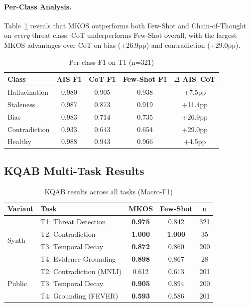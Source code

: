 \documentclass[11pt]{article}
\begin{document}
\paragraph{Per-Class Analysis.} Table~\ref{tab:perclass} reveals that MKOS outperforms both Few-Shot and Chain-of-Thought on \emph{every} threat class. CoT underperforms Few-Shot overall, with the largest MKOS advantages over CoT on bias (+26.9pp) and contradiction (+29.0pp).

\begin{table}[h]
\centering
\caption{Per-class F1 on T1 (n=321)}
\label{tab:perclass}
\begin{tabular}{lcccc}
\toprule
\textbf{Class} & \textbf{AIS F1} & \textbf{CoT F1} & \textbf{Few-Shot F1} & \textbf{$\Delta$ AIS--CoT} \\
\midrule
Hallucination & 0.980 & 0.905 & 0.938 & +7.5pp \\
Staleness & 0.987 & 0.873 & 0.919 & +11.4pp \\
Bias & 0.983 & 0.714 & 0.735 & +26.9pp \\
Contradiction & 0.933 & 0.643 & 0.654 & +29.0pp \\
Healthy & 0.988 & 0.943 & 0.966 & +4.5pp \\
\bottomrule
\end{tabular}
\end{table}

\subsection{KQAB Multi-Task Results}

\begin{table}[h]
\centering
\caption{KQAB results across all tasks (Macro-F1)}
\label{tab:kqab}
\begin{tabular}{llccc}
\toprule
\textbf{Variant} & \textbf{Task} & \textbf{MKOS} & \textbf{Few-Shot} & \textbf{n} \\
\midrule
\multirow{4}{*}{Synth}
& T1: Threat Detection & \textbf{0.975} & 0.842 & 321 \\
& T2: Contradiction & \textbf{1.000} & \textbf{1.000} & 35 \\
& T3: Temporal Decay & \textbf{0.872} & 0.860 & 200 \\
& T4: Evidence Grounding & \textbf{0.898} & 0.867 & 28 \\
\midrule
\multirow{3}{*}{Public}
& T2: Contradiction (MNLI) & 0.612 & 0.613 & 201 \\
& T3: Temporal Decay & \textbf{0.905} & 0.894 & 200 \\
& T4: Grounding (FEVER) & \textbf{0.593} & 0.586 & 201 \\
\bottomrule
\end{tabular}
\end{table}
\end{document}
